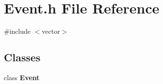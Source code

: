 \section{Event.\+h File Reference}
\label{Event_8h}
{\ttfamily \#include $<$vector$>$}\newline
\subsection*{Classes}
\begin{DoxyCompactItemize}
\item 
class \textbf{ Event}
\end{DoxyCompactItemize}
